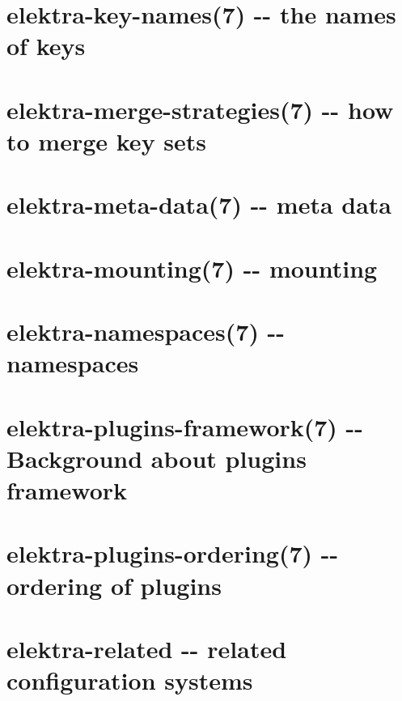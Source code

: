 \documentclass[twoside]{book}
\newcommand{\+}{\discretionary{\mbox{\scriptsize$\hookleftarrow$}}{}{}}
\begin{document}
\chapter{elektra-\/key-\/names(7) -\/-\/ the names of keys}
\label{md_doc_help_elektra-key-names}
\hypertarget{md_doc_help_elektra-key-names}{}

\chapter{elektra-\/merge-\/strategies(7) -\/-\/ how to merge key sets}
\label{md_doc_help_elektra-merge-strategy}
\hypertarget{md_doc_help_elektra-merge-strategy}{}

\chapter{elektra-\/meta-\/data(7) -\/-\/ meta data}
\label{md_doc_help_elektra-meta-data}
\hypertarget{md_doc_help_elektra-meta-data}{}

\chapter{elektra-\/mounting(7) -\/-\/ mounting}
\label{md_doc_help_elektra-mounting}
\hypertarget{md_doc_help_elektra-mounting}{}

\chapter{elektra-\/namespaces(7) -\/-\/ namespaces}
\label{md_doc_help_elektra-namespaces}
\hypertarget{md_doc_help_elektra-namespaces}{}

\chapter{elektra-\/plugins-\/framework(7) -\/-\/ Background about plugins framework}
\label{md_doc_help_elektra-plugins-framework}
\hypertarget{md_doc_help_elektra-plugins-framework}{}

\chapter{elektra-\/plugins-\/ordering(7) -\/-\/ ordering of plugins}
\label{md_doc_help_elektra-plugins-ordering}
\hypertarget{md_doc_help_elektra-plugins-ordering}{}

\chapter{elektra-\/related -\/-\/ related configuration systems}
\label{md_doc_help_elektra-related}
\hypertarget{md_doc_help_elektra-related}{}

\end{document}
